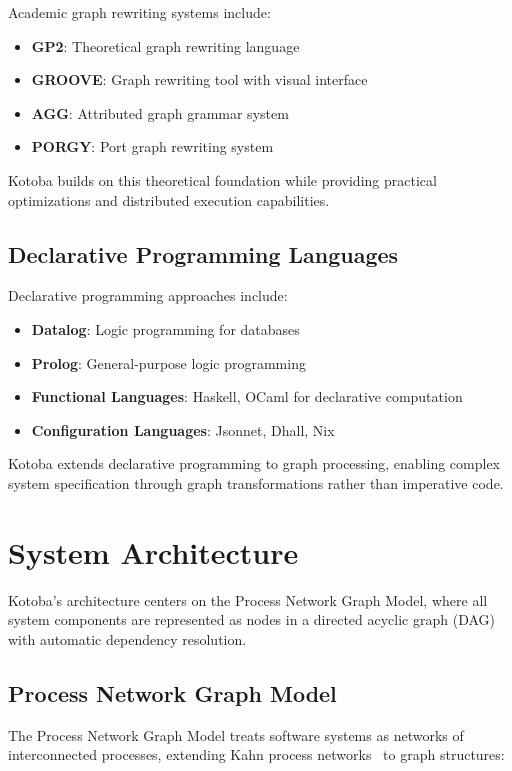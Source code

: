 \documentclass[11pt,a4paper]{article}
\begin{document}
Academic graph rewriting systems include:
\begin{itemize}
\item \textbf{GP2}: Theoretical graph rewriting language
\item \textbf{GROOVE}: Graph rewriting tool with visual interface
\item \textbf{AGG}: Attributed graph grammar system
\item \textbf{PORGY}: Port graph rewriting system
\end{itemize}

Kotoba builds on this theoretical foundation while providing practical optimizations and distributed execution capabilities.

\subsection{Declarative Programming Languages}
\label{subsec:declarative}

Declarative programming approaches include:
\begin{itemize}
\item \textbf{Datalog}: Logic programming for databases
\item \textbf{Prolog}: General-purpose logic programming
\item \textbf{Functional Languages}: Haskell, OCaml for declarative computation
\item \textbf{Configuration Languages}: Jsonnet, Dhall, Nix
\end{itemize}

Kotoba extends declarative programming to graph processing, enabling complex system specification through graph transformations rather than imperative code.

\section{System Architecture}
\label{sec:architecture}

Kotoba's architecture centers on the Process Network Graph Model, where all system components are represented as nodes in a directed acyclic graph (DAG) with automatic dependency resolution.

\subsection{Process Network Graph Model}
\label{subsec:process_model}

The Process Network Graph Model treats software systems as networks of interconnected processes, extending Kahn process networks~\cite{kahn1974} to graph structures:
\end{document}

